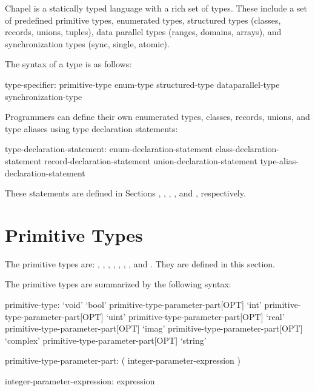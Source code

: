 \label{Types}

Chapel is a statically typed language with a rich set of types.  These
include a set of predefined primitive types, enumerated types,
structured types (classes, records, unions, tuples),
data parallel types (ranges, domains, arrays), and synchronization
types (sync, single, atomic).

The syntax of a type is as follows:

\begin{syntax}
type-specifier:
  primitive-type
  enum-type
  structured-type
  dataparallel-type
  synchronization-type
\end{syntax}

Programmers can define their own enumerated types, classes, records,
unions, and type aliases using type declaration statements:

\begin{syntax}
type-declaration-statement:
  enum-declaration-statement
  class-declaration-statement
  record-declaration-statement
  union-declaration-statement
  type-alias-declaration-statement
\end{syntax}

These statements are defined in Sections ,
, ,
, and , respectively.

\section{Primitive Types}
\label{Primitive_Types}

The primitive types are: , ,
, , , , ,
and .  They are defined
in this section.

The primitive types are summarized by the following syntax:
\begin{syntax}
primitive-type:
  `void'
  `bool' primitive-type-parameter-part[OPT]
  `int' primitive-type-parameter-part[OPT]
  `uint' primitive-type-parameter-part[OPT]
  `real' primitive-type-parameter-part[OPT]
  `imag' primitive-type-parameter-part[OPT]
  `complex' primitive-type-parameter-part[OPT]
  `string'

primitive-type-parameter-part:
  ( integer-parameter-expression )

integer-parameter-expression:
  expression
\end{syntax}

